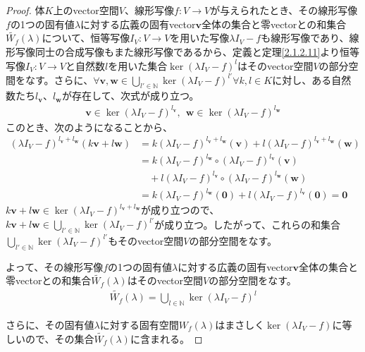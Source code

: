 \documentclass[dvipdfmx]{jsarticle}
\begin{document}
\begin{proof}
体$K$上のvector空間$V$、線形写像$f:V \rightarrow V$が与えられたとき、その線形写像$f$の1つの固有値$\lambda$に対する広義の固有vector$\mathbf{v}$全体の集合と零vectorとの和集合$\widetilde{W_{f}}(\lambda)$について、恒等写像$I_{V}:V \rightarrow V$を用いた写像$\lambda I_{V} - f$も線形写像であり、線形写像同士の合成写像もまた線形写像であるから、定義と定理\ref{2.1.2.11}より恒等写像$I_{V}:V \rightarrow V$と自然数$l$を用いた集合$\ker\left( \lambda I_{V} - f \right)^{l}$はそのvector空間$V$の部分空間をなす。さらに、$\forall\mathbf{v},\mathbf{w} \in \bigcup_{l' \in \mathbb{N}} {\ker\left( \lambda I_{V} - f \right)^{l'}}\forall k,l \in K$に対し、ある自然数たち$l_{\mathbf{v}}$、$l_{\mathbf{w}}$が存在して、次式が成り立つ。
\begin{align*}
\mathbf{v} \in \ker\left( \lambda I_{V} - f \right)^{l_{\mathbf{v}}},\ \ \mathbf{w} \in \ker\left( \lambda I_{V} - f \right)^{l_{\mathbf{w}}}
\end{align*}
このとき、次のようになることから、
\begin{align*}
\left( \lambda I_{V} - f \right)^{l_{\mathbf{v}} + l_{\mathbf{w}}}\left( k\mathbf{v} + l\mathbf{w} \right) &= k\left( \lambda I_{V} - f \right)^{l_{\mathbf{v}} + l_{\mathbf{w}}}\left( \mathbf{v} \right) + l\left( \lambda I_{V} - f \right)^{l_{\mathbf{v}} + l_{\mathbf{w}}}\left( \mathbf{w} \right)\\
&= k\left( \lambda I_{V} - f \right)^{l_{\mathbf{w}}} \circ \left( \lambda I_{V} - f \right)^{l_{\mathbf{v}}}\left( \mathbf{v} \right) \\
&\quad + l\left( \lambda I_{V} - f \right)^{l_{\mathbf{v}}} \circ \left( \lambda I_{V} - f \right)^{l_{\mathbf{w}}}\left( \mathbf{w} \right)\\
&= k\left( \lambda I_{V} - f \right)^{l_{\mathbf{w}}}\left( \mathbf{0} \right) + l\left( \lambda I_{V} - f \right)^{l_{\mathbf{v}}}\left( \mathbf{0} \right) = \mathbf{0}
\end{align*}
$k\mathbf{v} + l\mathbf{w} \in \ker\left( \lambda I_{V} - f \right)^{l_{\mathbf{v}} + l_{\mathbf{w}}}$が成り立つので、$k\mathbf{v} + l\mathbf{w} \in \bigcup_{l' \in \mathbb{N}} {\ker\left( \lambda I_{V} - f \right)^{l'}}$が成り立つ。したがって、これらの和集合$\bigcup_{l' \in \mathbb{N}} {\ker\left( \lambda I_{V} - f \right)^{l'}}$もそのvector空間$V$の部分空間をなす。\par
よって、その線形写像$f$の1つの固有値$\lambda$に対する広義の固有vector$\mathbf{v}$全体の集合と零vectorとの和集合$\widetilde{W_{f}}(\lambda)$はそのvector空間$V$の部分空間をなす。
\begin{align*}
\widetilde{W_{f}}(\lambda) = \bigcup_{l \in \mathbb{N}} {\ker\left( \lambda I_{V} - f \right)^{l}}
\end{align*}\par
さらに、その固有値$\lambda$に対する固有空間$W_{f}(\lambda)$はまさしく$\ker\left( \lambda I_{V} - f \right)$に等しいので、その集合$\widetilde{W_{f}}(\lambda)$に含まれる。
\end{proof}
\end{document}
